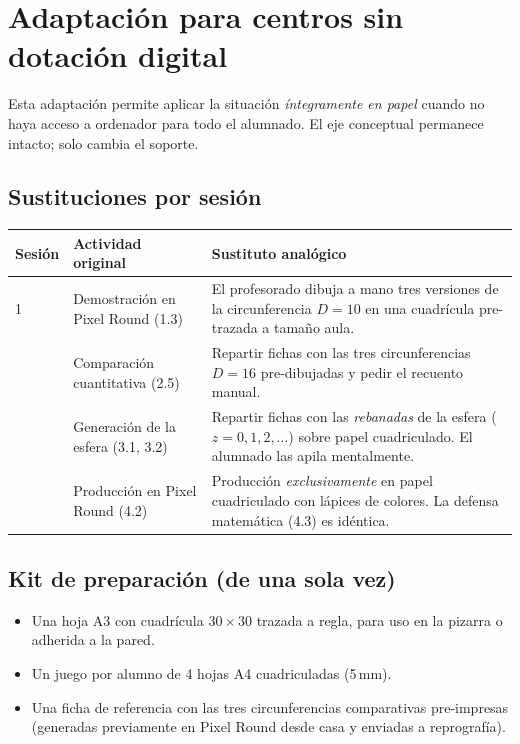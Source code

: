 \documentclass[12pt,a4paper]{scrartcl}
\begin{document}
\newpage
\section{Adaptación para centros sin dotación digital}\label{ap:adapt}

Esta adaptación permite aplicar la situación \emph{íntegramente en papel} cuando no haya acceso a ordenador para todo el alumnado. El eje conceptual permanece intacto; solo cambia el soporte.

\subsection{Sustituciones por sesión}

\begin{center}
\small
\begin{tabularx}{\textwidth}{@{}p{}p{}X@{}}
\toprule
\textbf{Sesión} & \textbf{Actividad original} & \textbf{Sustituto analógico} \\
\midrule
1 & Demostración en Pixel Round (1.3) & El profesorado dibuja a mano tres versiones de la circunferencia $D = 10$ en una cuadrícula pre-trazada a tamaño aula. \\
\addlinespace[3pt]
2 & Comparación cuantitativa (2.5) & Repartir fichas con las tres circunferencias $D = 16$ pre-dibujadas y pedir el recuento manual. \\
\addlinespace[3pt]
3 & Generación de la esfera (3.1, 3.2) & Repartir fichas con las \emph{rebanadas} de la esfera ($z = 0, 1, 2, \ldots$) sobre papel cuadriculado. El alumnado las apila mentalmente. \\
\addlinespace[3pt]
4 & Producción en Pixel Round (4.2) & Producción \emph{exclusivamente} en papel cuadriculado con lápices de colores. La defensa matemática (4.3) es idéntica. \\
\bottomrule
\end{tabularx}
\end{center}

\subsection{Kit de preparación (de una sola vez)}
\begin{itemize}[leftmargin=1.3em,itemsep=0.1em,topsep=0.2em,nosep]
  \item Una hoja A3 con cuadrícula $30 \times 30$ trazada a regla, para uso en la pizarra o adherida a la pared.
  \item Un juego por alumno de 4 hojas A4 cuadriculadas (5\,mm).
  \item Una ficha de referencia con las tres circunferencias comparativas pre-impresas (generadas previamente en Pixel Round desde casa y enviadas a reprografía).
\end{itemize}
\end{document}
